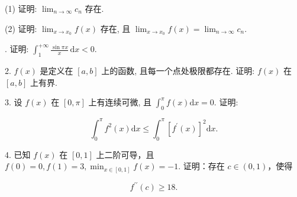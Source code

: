 \documentclass{examcollection}
\renewcommand{\displayformula}[1]{\[#1\]}
\begin{document}
{\begin{minipage}{\textwidth}
(1) 证明: $\lim_{n\to \infty}c_n$ 存在.\par
(2) 证明: $\lim_{x \to x_0} f(x)$ 存在, 且 $\lim_{x \to x_0} f(x) = \lim_{n \to \infty} c_n$.\par
{}. 证明: $\int_{1}^{+\infty} \frac{\sin \pi x}{x} \, \mathrm{d}x < 0$.\par
2. $f(x)$ 是定义在 $[a, b]$ 上的函数, 且每一个点处极限都存在. 证明: $f(x)$ 在 $[a, b]$ 上有界.\par
3. 设 $f(x)$ 在 $[0, \pi]$ 上有连续可微, 且 $\int_0^\pi f(x) \mathrm{d}x = 0$. 证明:\par
\displayformula{\int_ {0} ^ {\pi} f ^ {2} (x) \mathrm{d} x \leq \int_ {0} ^ {\pi} [ f ^ {\prime} (x) ] ^ {2} \mathrm{d} x.}\par
4. 已知 $f(x)$ 在 $[0,1]$ 上二阶可导，且 $f(0) = 0, f(1) = 3, \min_{x \in [0,1]} f(x) = -1$. 证明：存在 $c \in (0,1)$，使得\par
\displayformula{f ^ {\prime \prime} (c) \geq 18.}\par
\end{minipage}}
\ifdim\dimexpr\ht\proofbox+\dp\proofbox\relax>\textheight
\noindent\resizebox{!}{\textheight}{\usebox{\proofbox}}\else\noindent\usebox{\proofbox}\fi\clearpage
\end{document}
